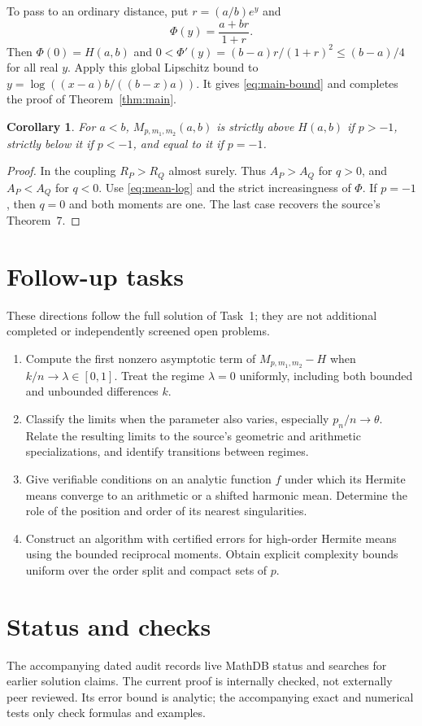\documentclass[11pt]{article}
\newtheorem{corollary}{Corollary}
\begin{document}
To pass to an ordinary distance, put $r=(a/b)e^y$ and
\[
\Phi(y)=\frac{a+br}{1+r}.
\]
Then $\Phi(0)=H(a,b)$ and
$0<\Phi'(y)=(b-a)r/(1+r)^2\le(b-a)/4$ for all real $y$.
Apply this global Lipschitz bound to
$y=\log((x-a)b/((b-x)a))$. It gives \eqref{eq:main-bound} and completes
the proof of Theorem~\ref{thm:main}.

\begin{corollary}
For $a<b$, $M_{p,m_1,m_2}(a,b)$ is strictly above $H(a,b)$ if $p>-1$,
strictly below it if $p<-1$, and equal to it if $p=-1$.
\end{corollary}
\begin{proof}
In the coupling $R_P>R_Q$ almost surely. Thus $A_P>A_Q$ for $q>0$,
and $A_P<A_Q$ for $q<0$. Use \eqref{eq:mean-log} and the strict
increasingness of $\Phi$. If $p=-1$, then $q=0$ and both moments are one.
The last case recovers the source's Theorem~7.
\end{proof}

\section*{Follow-up tasks}
These directions follow the full solution of Task~1; they are not
additional completed or independently screened open problems.
\begin{enumerate}[label=\textbf{Task \arabic*:},start=2,leftmargin=*]
\item Compute the first nonzero asymptotic term of $M_{p,m_1,m_2}-H$
when $k/n\to\lambda\in[0,1]$. Treat the regime $\lambda=0$ uniformly,
including both bounded and unbounded differences $k$.
\item Classify the limits when the parameter also varies, especially
$p_n/n\to\theta$. Relate the resulting limits to the source's geometric
and arithmetic specializations, and identify transitions between regimes.
\item Give verifiable conditions on an analytic function $f$ under which
its Hermite means converge to an arithmetic or a shifted harmonic mean.
Determine the role of the position and order of its nearest singularities.
\item Construct an algorithm with certified errors for high-order
Hermite means using the bounded reciprocal moments. Obtain explicit
complexity bounds uniform over the order split and compact sets of $p$.
\end{enumerate}

\section*{Status and checks}
The accompanying dated audit records live MathDB status and searches for
earlier solution claims. The current proof is internally checked, not
externally peer reviewed. Its error bound is analytic; the accompanying
exact and numerical tests only check formulas and examples.
\end{document}
